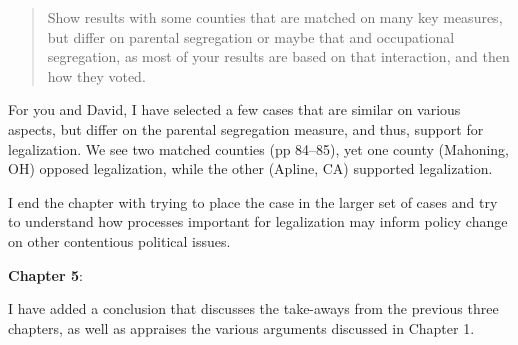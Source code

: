 \documentclass[12pt,stdletter,dateno,sigleft]{newlfm} %
\begin{document}
\begin{newlfm}
\begin{quotation}{\color{red}\noindent \footnotesize
Show results with some counties that are matched on many key measures, but differ on parental segregation or maybe that and occupational segregation, as most of your results are based on that interaction, and then how they voted. 
}
\end{quotation}


For you and David, I have selected a few cases that are similar on various aspects, but differ on the parental segregation measure, and thus, support for legalization. We see two matched counties (pp 84--85), yet one county (Mahoning, OH) opposed legalization, while the other (Apline, CA) supported legalization. 


I end the chapter with trying to place the case in the larger set of cases and try to understand how processes important for legalization may inform policy change on other contentious political issues. \newline



\textbf{Chapter 5}: 

I have added a conclusion that discusses the take-aways from the previous three chapters, as well as appraises the various arguments discussed in Chapter 1.



\end{newlfm}
\end{document}
